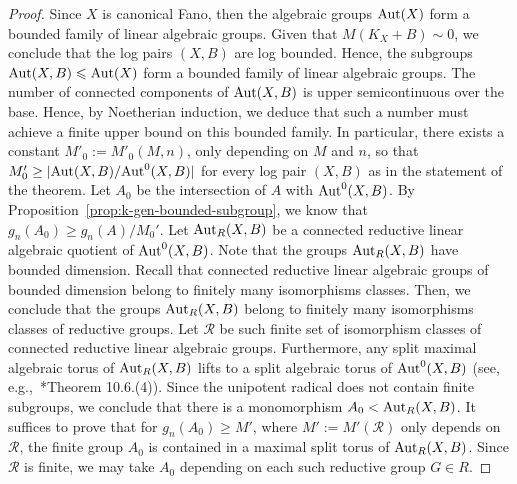 \documentclass{amsart}
\theoremstyle{remark}
\numberwithin{equation}{section}
\begin{document}
\begin{proof}
Since $X$ is canonical Fano, then the algebraic groups ${\rm Aut}(X)$ form a bounded family of linear algebraic groups.
Given that $M(K_X+B)\sim 0$, we conclude that
the log pairs $(X,B)$ are log bounded.
Hence, the subgroups
${\rm Aut}(X,B)\leqslant {\rm Aut}(X)$ form a bounded family of linear algebraic groups.
The number of connected components of ${\rm Aut}(X,B)$ is upper semicontinuous over the base.
Hence, by Noetherian induction, we deduce that such a number must achieve a finite upper bound on this bounded family.
In particular, there exists a constant $M'_0:=M'_0(M,n)$, only depending on $M$ and $n$, so that
$M'_0 \geq |{\rm Aut}(X,B)/{\rm Aut}^0(X,B)|$ for every log pair $(X,B)$ as in the statement of the theorem.
Let $A_0$ be the intersection of $A$ with ${\rm Aut}^0(X,B)$.
By Proposition~\ref{prop:k-gen-bounded-subgroup}, we know that $g_n(A_0)\geq g_n(A)/M_0'$.
Let ${\rm Aut}_R(X,B)$ be a connected reductive linear algebraic quotient of ${\rm Aut}^0(X,B)$.
Note that the groups ${\rm Aut}_R(X,B)$ have bounded dimension.
Recall that connected reductive linear algebraic groups of bounded dimension belong to
finitely many isomorphisms classes.
Then, we conclude that the groups
${\rm Aut}_R(X,B)$ belong to finitely many isomorphisms classes of reductive groups.
Let $\mathcal{R}$ be such finite set of isomorphism classes
of connected reductive linear algebraic groups.
Furthermore, any split maximal algebraic torus of ${\rm Aut}_R(X,B)$ lifts to a split algebraic torus of ${\rm Aut}^0(X,B)$ (see, e.g.,~\cite{Bor91}*{Theorem 10.6.(4)}).
Since the unipotent radical does not contain finite subgroups, we conclude that there is a monomorphism
$A_0 < {\rm Aut}_R(X,B)$.
It suffices to prove that
for $g_n(A_0)\geq M'$, where $M':=M'(\mathcal{R})$ only depends on $\mathcal{R}$, the finite group $A_0$ is contained in a maximal split torus of ${\rm Aut}_R(X,B)$.
Since $\mathcal{R}$ is finite, we may take $A_0$ depending on each such reductive group $G\in R$.


\end{proof}
\end{document}
